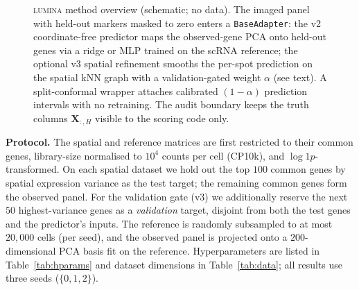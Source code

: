\documentclass[10pt,letterpaper]{article}
\begin{document}
\begin{figure}[t]
  \caption{\textsc{lumina} method overview (schematic; no data).
  The imaged panel with held-out markers masked to zero enters a \texttt{BaseAdapter}:
  the v2 coordinate-free predictor maps the observed-gene PCA onto held-out genes via a
  ridge or MLP trained on the scRNA reference; the optional v3 spatial refinement
  smooths the per-spot prediction on the spatial kNN graph with a validation-gated weight
  $\alpha$ (see text). A split-conformal wrapper attaches calibrated $(1-\alpha)$
  prediction intervals with no retraining. The audit boundary keeps the truth columns
  $\mathbf{X}_{:,H}$ visible to the scoring code only.}
  \label{fig:overview}
\end{figure}

\textbf{Protocol.} The spatial and reference matrices are first restricted to their common
genes, library-size normalised to $10^4$ counts per cell (CP10k), and $\log\!1p$-transformed.
On each spatial dataset we hold out the top $100$ common genes by spatial expression variance
as the test target; the remaining common genes form the observed panel. For the validation
gate (v3) we additionally reserve the next $50$ highest-variance genes as a \emph{validation}
target, disjoint from both the test genes and the predictor's inputs. The reference is randomly
subsampled to at most $20{,}000$ cells (per seed), and the observed panel is projected onto a
$200$-dimensional PCA basis fit on the reference. Hyperparameters are listed in
Table~\ref{tab:hparams} and dataset dimensions in Table~\ref{tab:data}; all results use three
seeds ($\{0,1,2\}$).
\end{document}
